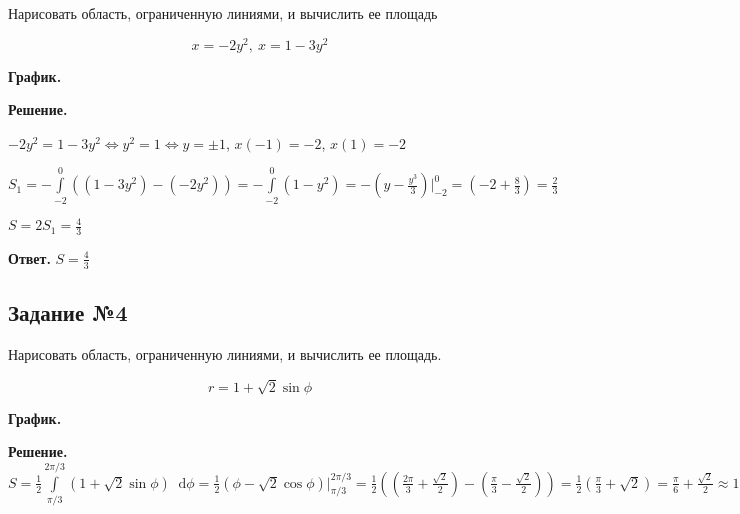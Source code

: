 \documentclass{article}
\newcommand*\diff{\mathop{}\!\mathrm{d}}
\begin{document}
Нарисовать область, ограниченную линиями, и вычислить ее площадь

$$
x = -2y^2, \ x = 1 - 3y^2
$$

\textbf{График.}

\begin{center}
\end{center}

\textbf{Решение.}

$-2y^2 = 1 - 3y^2 \Longleftrightarrow y^2 = 1 \Longleftrightarrow y = \pm 1$, $x(-1) = -2$, $x(1) = -2$

$S_{1} = - \int\limits_{-2}^{0} ((1 - 3y^2) - (-2y^2)) = -\int\limits_{-2}^{0} (1 - y^2) = - (y - \frac{y^3}{3}) \bigg|_{-2}^{0} = (-2 + \frac{8}{3}) = \frac{2}{3}$

$S = 2 S_{1} = \frac{4}{3}$

\hfill

\textbf{Ответ.} $S = \frac{4}{3}$

\subsection{Задание №4}

Нарисовать область, ограниченную линиями, и вычислить ее площадь.

$$
r = 1 + \sqrt{2} \sin \phi
$$

\textbf{График.}

\begin{center}
\end{center}

\textbf{Решение.} $S = \frac{1}{2} \int\limits_{\pi/3}^{2\pi/3} (1 + \sqrt{2} \sin \phi) \diff \phi = \frac{1}{2} (\phi - \sqrt{2} \cos \phi) \bigg|_{\pi/3}^{2\pi/3} = \frac{1}{2} ((\frac{2 \pi}{3} + \frac{\sqrt{2}}{2}) - (\frac{\pi}{3} - \frac{\sqrt{2}}{2})) = \frac{1}{2} (\frac{\pi}{3} + \sqrt{2}) = \frac{\pi}{6} + \frac{\sqrt{2}}{2} \approx 1.23$
\end{document}
